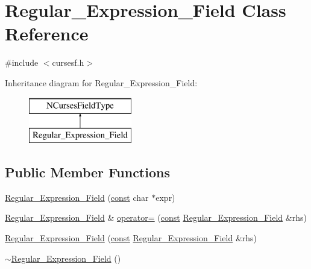 \hypertarget{class_regular___expression___field}{\section{Regular\-\_\-\-Expression\-\_\-\-Field Class Reference}
\label{class_regular___expression___field}
}


{\ttfamily \#include $<$cursesf.\-h$>$}

Inheritance diagram for Regular\-\_\-\-Expression\-\_\-\-Field\-:\begin{figure}[H]
\begin{center}
\leavevmode
\includegraphics[height=2.000000cm]{class_regular___expression___field}
\end{center}
\end{figure}
\subsection*{Public Member Functions}
\begin{DoxyCompactItemize}
\item 
\hyperlink{class_regular___expression___field_a9e29bc62804144dabb309b7904e41952}{Regular\-\_\-\-Expression\-\_\-\-Field} (\hyperlink{term__entry_8h_a57bd63ce7f9a353488880e3de6692d5a}{const} char $\ast$expr)
\item 
\hyperlink{class_regular___expression___field}{Regular\-\_\-\-Expression\-\_\-\-Field} \& \hyperlink{class_regular___expression___field_aa6b64fa18b08f99477b10e87ef4d96c7}{operator=} (\hyperlink{term__entry_8h_a57bd63ce7f9a353488880e3de6692d5a}{const} \hyperlink{class_regular___expression___field}{Regular\-\_\-\-Expression\-\_\-\-Field} \&rhs)
\item 
\hyperlink{class_regular___expression___field_a5ded491d288fbf0ac15a148861a53e56}{Regular\-\_\-\-Expression\-\_\-\-Field} (\hyperlink{term__entry_8h_a57bd63ce7f9a353488880e3de6692d5a}{const} \hyperlink{class_regular___expression___field}{Regular\-\_\-\-Expression\-\_\-\-Field} \&rhs)
\item 
\hyperlink{class_regular___expression___field_a8bac74c84107d0b7778731e48a6836b4}{$\sim$\-Regular\-\_\-\-Expression\-\_\-\-Field} ()
\end{DoxyCompactItemize}
